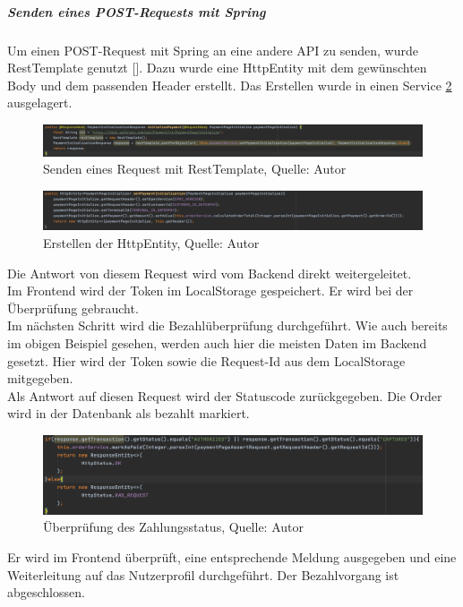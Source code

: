 \subparagraph{Senden eines POST-Requests mit Spring}\label{postSpring}
Um einen POST-Request mit Spring an eine andere API zu senden, wurde \gls{RestTemplate} genutzt [\cite{restTemplate}]. Dazu wurde eine HttpEntity mit dem gewünschten Body und dem passenden Header erstellt. Das Erstellen wurde in einen Service \ref{img: httpEntity} ausgelagert. 
\begin{figure}[H]
	\includegraphics[width=1\textwidth]{images/restTemplate.PNG}
	\caption[Senden eines Request mit RestTemplate]{Senden eines Request mit RestTemplate, Quelle: Autor}
	\label{img: restTemplate}
\end{figure}
\begin{figure}[H]
	\includegraphics[width=1\textwidth]{images/httpEntity.PNG}
	\caption[Erstellen der HttpEntity]{Erstellen der HttpEntity, Quelle: Autor}
	\label{img: httpEntity}
\end{figure}

Die Antwort von diesem Request wird vom Backend direkt weitergeleitet. \\Im Frontend wird der Token im \gls{LocalStorage} gespeichert. Er wird bei der Überprüfung gebraucht.
\\
Im nächsten Schritt wird die Bezahlüberprüfung durchgeführt. Wie auch bereits im obigen Beispiel gesehen, werden auch hier die meisten Daten im Backend gesetzt. Hier wird der Token sowie die Request-Id aus dem \gls{LocalStorage} mitgegeben. \\
Als Antwort auf diesen Request wird der Statuscode zurückgegeben. Die Order wird in der Datenbank als bezahlt markiert. 
 \begin{figure}[H]
	\centering
	\includegraphics[width=1\textwidth]{images/pageAssertReturn.PNG}
	\caption[Überprüfung des Zahlungsstatus]{Überprüfung des Zahlungsstatus, Quelle: Autor}
	\label{img: pageAssertReturn}
\end{figure} 
Er wird im Frontend überprüft, eine entsprechende Meldung ausgegeben und eine Weiterleitung auf das Nutzerprofil durchgeführt. Der Bezahlvorgang ist abgeschlossen.  

